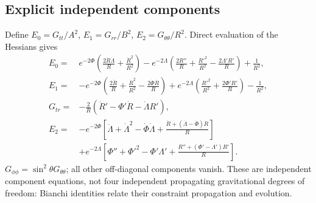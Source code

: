 \subsection{Explicit independent components}
Define $E_0=G_{tt}/A^2$, $E_1=G_{rr}/B^2$, $E_2=G_{\theta\theta}/R^2$. Direct evaluation of the Hessians gives
\begin{align}
 E_0={}&e^{-2\Phi}\left(\frac{2\dot R\dot\Lambda}{R}+\frac{\dot R^2}{R^2}\right)
 -e^{-2\Lambda}\left(\frac{2R''}{R}+\frac{R'^2}{R^2}-\frac{2\Lambda'R'}R\right)+\frac1{R^2},\label{eq:E0}\\
 E_1={}&-e^{-2\Phi}\left(\frac{2\ddot R}R+\frac{\dot R^2}{R^2}-\frac{2\dot\Phi\dot R}R\right)
 +e^{-2\Lambda}\left(\frac{R'^2}{R^2}+\frac{2\Phi'R'}R\right)-\frac1{R^2},\label{eq:E1}\\
 G_{tr}={}&-\frac2R(\dot R'-\Phi'\dot R-\dot\Lambda R'),\label{eq:Etr}\\
 E_2={}&-e^{-2\Phi}\left[\ddot\Lambda+\dot\Lambda^2-\dot\Phi\dot\Lambda+
 \frac{\ddot R+(\dot\Lambda-\dot\Phi)\dot R}{R}\right]\nonumber\\
 &+e^{-2\Lambda}\left[\Phi''+\Phi'^2-\Phi'\Lambda'+
 \frac{R''+(\Phi'-\Lambda')R'}R\right].\label{eq:E2}
\end{align}
$G_{\phi\phi}=\sin^2\theta G_{\theta\theta}$; all other off-diagonal components vanish. These are independent component equations, not four independent propagating gravitational degrees of freedom: Bianchi identities relate their constraint propagation and evolution.


